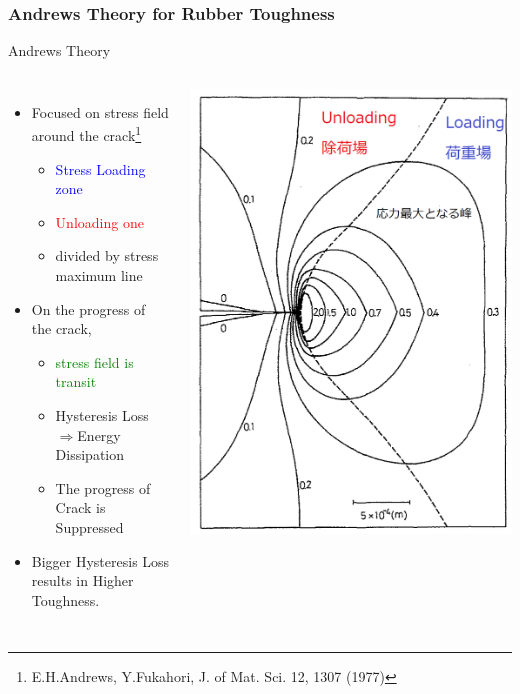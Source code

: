 \documentclass[12pt, dvipdfmx]{beamer}
\begin{document}
\begin{frame}
	\frametitle{Andrews Theory for Rubber Toughness}
		\begin{exampleblock}{Andrews Theory}
			\begin{columns}[T, onlytextwidth]
				\begin{itemize}
					\item Focused on \alert{stress field around the crack}\footnote{
						\scriptsize
			{E.H.Andrews, Y.Fukahori, J. of Mat. Sci. 12, 1307 (1977)}
					}
						\begin{itemize}
							\item \textcolor{blue}{Stress Loading zone}
							\item \textcolor{red}{Unloading one}
							\item divided by stress maximum line
						\end{itemize}
					\item On the progress of the crack, 
						\begin{itemize}
							\item \textcolor{green}{stress field is transit}
							\item Hysteresis Loss$\Rightarrow${Energy Dissipation}
							\item The progress of Crack is \alert{Suppressed}
						\end{itemize}
					\item Bigger Hysteresis Loss results in  Higher Toughness.
				\end{itemize}
					\begin{center}
						\includegraphics[width=.85\textwidth]{crack.png}

\end{center}
\end{columns}
\end{exampleblock}
\end{frame}
\end{document}
